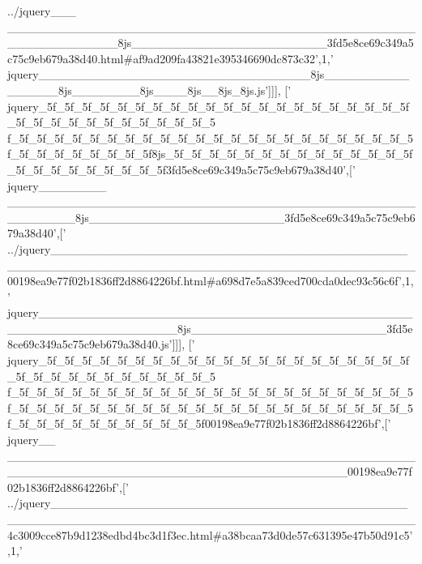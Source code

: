 \begin{DoxyCode}
{      ../jquery\_\_\_
      \_\_\_\_\_\_\_\_\_\_\_\_\_\_\_\_\_\_\_\_\_\_\_\_\_\_\_\_\_\_\_\_\_\_\_\_\_\_\_\_\_\_\_\_\_\_\_\_\_\_\_\_\_\_\_\_\_\_\_\_\_8js\_\_\_\_\_\_\_\_\_\_\_\_\_\_\_\_\_\_\_\_\_\_\_3fd5e8ce69c349a5c75c9eb679a38d40.html#af9ad209fa43821e395346690dc873c32'},1,\textcolor{stringliteral}{'
      jquery\_\_\_\_\_\_\_\_\_\_\_\_\_\_\_\_\_\_\_\_\_\_\_\_\_\_\_\_\_\_\_\_8js\_\_\_\_\_\_\_\_\_\_\_\_\_\_\_\_8js\_\_\_\_\_\_\_\_8js\_\_\_\_8js\_\_8js\_8js.js'}]]],
  [\textcolor{stringliteral}{'
      jquery\_5f\_5f\_5f\_5f\_5f\_5f\_5f\_5f\_5f\_5f\_5f\_5f\_5f\_5f\_5f\_5f\_5f\_5f\_5f\_5f\_5f\_5f\_5f\_5f\_5f\_5f\_5f\_5f\_5f\_5f\_5f\_5f\_5
      f\_5f\_5f\_5f\_5f\_5f\_5f\_5f\_5f\_5f\_5f\_5f\_5f\_5f\_5f\_5f\_5f\_5f\_5f\_5f\_5f\_5f\_5f\_5f\_5f\_5f\_5f\_5f\_5f\_5f\_5f\_5f8js\_5f\_5f\_5f\_5f\_5f\_5f\_5f\_5f\_5f\_5f\_5f\_5f\_5f\_5f\_5f\_5f\_5f\_5f\_5f\_5f\_5f\_5f\_5f3fd5e8ce69c349a5c75c9eb679a38d40'},[\textcolor{stringliteral}{'
      jquery\_\_\_\_\_\_\_\_
      \_\_\_\_\_\_\_\_\_\_\_\_\_\_\_\_\_\_\_\_\_\_\_\_\_\_\_\_\_\_\_\_\_\_\_\_\_\_\_\_\_\_\_\_\_\_\_\_\_\_\_\_\_\_\_\_8js\_\_\_\_\_\_\_\_\_\_\_\_\_\_\_\_\_\_\_\_\_\_\_3fd5e8ce69c349a5c75c9eb679a38d40'},[\textcolor{stringliteral}{'
      ../jquery\_\_\_\_\_\_\_\_\_\_\_\_\_\_\_\_\_\_\_\_\_\_\_\_\_\_\_\_\_\_\_\_\_\_\_\_\_\_\_\_\_\_\_\_\_\_\_\_\_\_\_\_\_\_\_\_\_\_\_\_\_\_\_\_\_\_\_\_\_\_\_\_\_\_\_\_\_\_\_\_\_\_\_\_\_\_\_\_\_\_00198ea9e77f02b1836ff2d8864226bf.html#a698d7e5a839ced700cda0dec93c56c6f'},1,\textcolor{stringliteral}{'
      jquery\_\_\_\_\_\_\_\_\_\_\_\_\_\_\_\_\_\_\_\_\_\_\_\_\_\_\_\_\_\_\_\_\_\_\_\_\_\_\_\_\_\_\_\_\_\_\_\_\_\_\_\_\_\_\_\_\_\_\_\_\_\_\_\_8js\_\_\_\_\_\_\_\_\_\_\_\_\_\_\_\_\_\_\_\_\_\_\_3fd5e8ce69c349a5c75c9eb679a38d40.js'}]]],
  [\textcolor{stringliteral}{'
      jquery\_5f\_5f\_5f\_5f\_5f\_5f\_5f\_5f\_5f\_5f\_5f\_5f\_5f\_5f\_5f\_5f\_5f\_5f\_5f\_5f\_5f\_5f\_5f\_5f\_5f\_5f\_5f\_5f\_5f\_5f\_5f\_5f\_5
      f\_5f\_5f\_5f\_5f\_5f\_5f\_5f\_5f\_5f\_5f\_5f\_5f\_5f\_5f\_5f\_5f\_5f\_5f\_5f\_5f\_5f\_5f\_5f\_5f\_5f\_5f\_5f\_5f\_5f\_5f\_5f\_5f\_5f\_5f\_5f\_5f\_5f\_5f\_5f\_5f\_5f\_5f\_5f\_5f\_5f\_5f\_5f\_5f\_5f\_5f\_5f\_5f\_5f\_5f\_5f\_5f\_5f00198ea9e77f02b1836ff2d8864226bf'},[\textcolor{stringliteral}{'
      jquery\_\_
      \_\_\_\_\_\_\_\_\_\_\_\_\_\_\_\_\_\_\_\_\_\_\_\_\_\_\_\_\_\_\_\_\_\_\_\_\_\_\_\_\_\_\_\_\_\_\_\_\_\_\_\_\_\_\_\_\_\_\_\_\_\_\_\_\_\_\_\_\_\_\_\_\_\_\_\_\_\_\_\_\_\_\_\_\_\_\_\_00198ea9e77f02b1836ff2d8864226bf'},[\textcolor{stringliteral}{'
      ../jquery\_\_\_\_\_\_\_\_\_\_\_\_\_\_\_\_\_\_\_\_\_\_\_\_\_\_\_\_\_\_\_\_\_\_\_\_\_\_\_\_\_\_\_\_\_\_\_\_\_\_\_\_\_\_\_\_\_\_\_\_\_\_\_\_\_\_\_\_\_\_\_\_\_\_\_\_\_\_\_\_\_\_\_\_\_\_\_\_\_\_4c3009cce87b9d1238edbd4bc3d1f3ec.html#a38bcaa73d0de57c631395e47b50d91c5'},1,\textcolor{stringliteral}{'
}
\end{DoxyCode}

